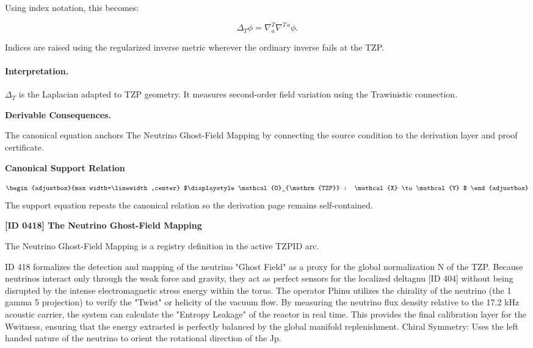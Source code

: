 Using index notation, this becomes:

\begin{equation}
\boxed{
\Delta_T\phi
=
\nabla^{T}_{a}\nabla^{T\,a}\phi .
}
\end{equation}

Indices are raised using the regularized inverse metric wherever the ordinary inverse fails at the TZP.

\paragraph{Interpretation.}
$\Delta_T$ is the Laplacian adapted to TZP geometry. It measures second-order field variation using the Trawinistic connection.

\par\vspace{0.35em}
\noindent\textbf{Derivable Consequences.}\quad
\begingroup
\footnotesize
\raggedright
The canonical equation anchors The Neutrino Ghost-Field Mapping by connecting the source condition to the derivation layer and proof certificate.
\par\endgroup

\noindent\textbf{Canonical Support Relation}\par
\[
\begin{adjustbox}{max width=\linewidth,center}
$\displaystyle
\mathcal{O}_{\mathrm{TZP}} : \mathcal{X} \to \mathcal{Y}
$
\end{adjustbox}
\]
\noindent The support equation repeats the canonical relation so the derivation page remains self-contained.\par

\clearpage
\noindent\textbf{[ID 0418] The Neutrino Ghost-Field Mapping}\par
\vspace{0.35em}
\begingroup\small
{}
The Neutrino Ghost-Field Mapping is a registry definition in the active TZPID arc.

ID 418 formalizes the detection and mapping of the neutrino "Ghost Field" as a proxy for the global normalization N of the TZP. Because neutrinos interact only through the weak force and gravity, they act as perfect sensors for the localized deltagnu [ID 404] without being disrupted by the intense electromagnetic stress energy within the torus. The operator Phinu utilizes the chirality of the neutrino (the 1 gamma 5 projection) to verify the "Twist" or helicity of the vacuum flow. By measuring the neutrino flux density relative to the 17.2 kHz acoustic carrier, the system can calculate the "Entropy Leakage" of the reactor in real time. This provides the final calibration layer for the Wwitness, ensuring that the energy extracted is perfectly balanced by the global manifold replenishment. Chiral Symmetry: Uses the left handed nature of the neutrino to orient the rotational direction of the Jp.

